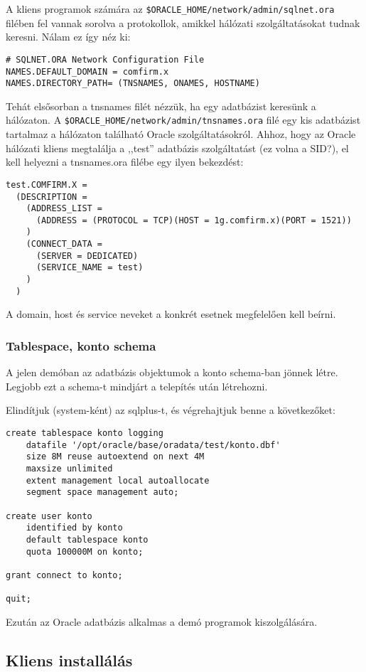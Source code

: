 A kliens programok számára az \verb!$ORACLE_HOME/network/admin/sqlnet.ora!
filében fel vannak sorolva a protokollok, amikkel hálózati szolgáltatásokat
tudnak keresni. Nálam ez így néz ki:
\begin{verbatim}
# SQLNET.ORA Network Configuration File
NAMES.DEFAULT_DOMAIN = comfirm.x
NAMES.DIRECTORY_PATH= (TNSNAMES, ONAMES, HOSTNAME)
\end{verbatim}
Tehát elsősorban a tnsnames filét nézzük,
ha egy adatbázist keresünk a hálózaton.
A  \verb!$ORACLE_HOME/network/admin/tnsnames.ora!
filé egy kis adatbázist tartalmaz a hálózaton található Oracle
szolgáltatásokról. Ahhoz, hogy az Oracle hálózati kliens megtalálja
a ,,test''  adatbázis szolgáltatást (ez volna a SID?), el kell helyezni 
a tnsnames.ora filébe egy ilyen bekezdést:
\begin{verbatim}
test.COMFIRM.X =
  (DESCRIPTION =
    (ADDRESS_LIST =
      (ADDRESS = (PROTOCOL = TCP)(HOST = 1g.comfirm.x)(PORT = 1521))
    )
    (CONNECT_DATA =
      (SERVER = DEDICATED)
      (SERVICE_NAME = test)
    )
  )
\end{verbatim}
A domain, host és service neveket a konkrét esetnek
megfelelően kell beírni.


\subsubsection*{Tablespace, konto schema}

A jelen demóban az adatbázis objektumok
a konto schema-ban jönnek létre. Legjobb ezt a
schema-t mindjárt a telepítés után létrehozni.

Elindítjuk  (system-ként) az sqlplus-t, és
végrehajtjuk benne a következőket:

\begin{verbatim}
create tablespace konto logging
    datafile '/opt/oracle/base/oradata/test/konto.dbf'
    size 8M reuse autoextend on next 4M
    maxsize unlimited
    extent management local autoallocate
    segment space management auto;

create user konto
    identified by konto
    default tablespace konto
    quota 100000M on konto;

grant connect to konto;

quit;
\end{verbatim}

Ezután az Oracle adatbázis alkalmas a demó programok kiszolgálására.

\subsection{Kliens installálás}

